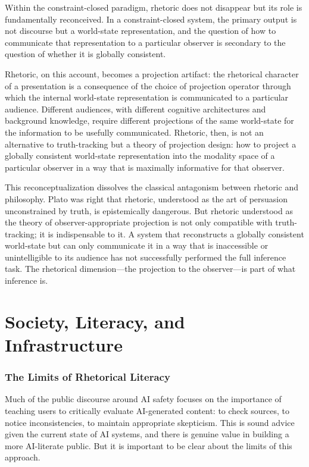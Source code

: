 \documentclass[11pt, oneside]{article}
\begin{document}
Within the constraint-closed paradigm, rhetoric does not disappear but its role is fundamentally reconceived. In a constraint-closed system, the primary output is not discourse but a world-state representation, and the question of how to communicate that representation to a particular observer is secondary to the question of whether it is globally consistent.

Rhetoric, on this account, becomes a projection artifact: the rhetorical character of a presentation is a consequence of the choice of projection operator through which the internal world-state representation is communicated to a particular audience. Different audiences, with different cognitive architectures and background knowledge, require different projections of the same world-state for the information to be usefully communicated. Rhetoric, then, is not an alternative to truth-tracking but a theory of projection design: how to project a globally consistent world-state representation into the modality space of a particular observer in a way that is maximally informative for that observer.

This reconceptualization dissolves the classical antagonism between rhetoric and philosophy. Plato was right that rhetoric, understood as the art of persuasion unconstrained by truth, is epistemically dangerous. But rhetoric understood as the theory of observer-appropriate projection is not only compatible with truth-tracking; it is indispensable to it. A system that reconstructs a globally consistent world-state but can only communicate it in a way that is inaccessible or unintelligible to its audience has not successfully performed the full inference task. The rhetorical dimension---the projection to the observer---is part of what inference is.

\part{Society, Literacy, and Infrastructure}

\section{The Limits of Rhetorical Literacy}

Much of the public discourse around AI safety focuses on the importance of teaching users to critically evaluate AI-generated content: to check sources, to notice inconsistencies, to maintain appropriate skepticism. This is sound advice given the current state of AI systems, and there is genuine value in building a more AI-literate public. But it is important to be clear about the limits of this approach.
\end{document}
